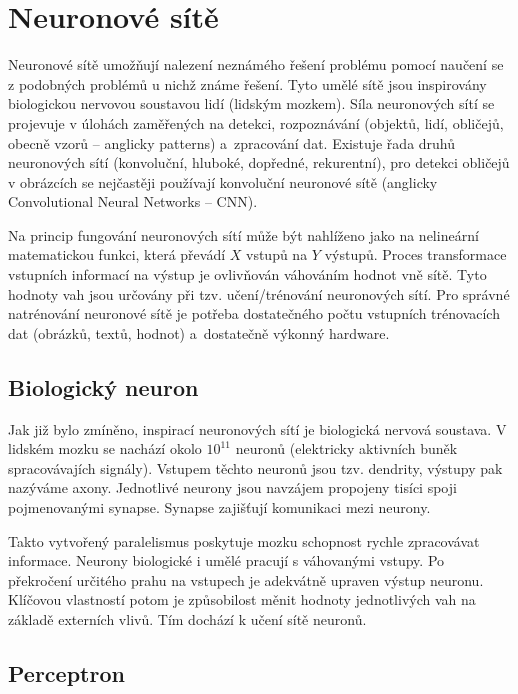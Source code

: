 \section{Neuronové sítě}
\label{sekce:NS}

Neuronové sítě \cite{deeplearningbook, ns1994} umožňují nalezení neznámého řešení problému pomocí naučení se z podobných problémů u nichž známe řešení. Tyto umělé sítě jsou inspirovány biologickou nervovou soustavou lidí (lidským mozkem). Síla neuronových sítí se projevuje v úlohách zaměřených na detekci, rozpoznávání (objektů, lidí, obličejů, obecně vzorů -- anglicky patterns) a~zpracování dat. Existuje řada druhů neuronových sítí (konvoluční, hluboké, dopředné, rekurentní), pro detekci obličejů v obrázcích se nejčastěji používají konvoluční neuronové sítě (anglicky Convolutional Neural Networks -- CNN). 

Na princip fungování neuronových sítí může být nahlíženo jako na nelineární matematickou funkci, která převádí $X$ vstupů na $Y$ výstupů. Proces transformace vstupních informací na výstup je ovlivňován váhováním hodnot vně sítě. Tyto hodnoty vah jsou určovány při tzv. učení/trénování neuronových sítí. Pro správné natrénování neuronové sítě je potřeba dostatečného počtu vstupních trénovacích dat (obrázků, textů, hodnot) a~dostatečně výkonný hardware. 

\subsection*{Biologický neuron}
Jak již bylo zmíněno, inspirací neuronových sítí je biologická nervová soustava. V lidském mozku se nachází okolo $10^{11}$ neuronů (elektricky aktivních buněk spracovávajích signály). Vstupem těchto neuronů jsou tzv. dendrity, výstupy pak nazýváme axony. Jednotlivé neurony jsou navzájem propojeny tisíci spoji pojmenovanými synapse. Synapse zajišťují komunikaci mezi neurony.

Takto vytvořený paralelismus poskytuje mozku schopnost rychle zpracovávat informace. Neurony biologické i umělé pracují s váhovanými vstupy. Po překročení určitého prahu na vstupech je adekvátně upraven výstup neuronu. Klíčovou vlastností potom je způsobilost měnit hodnoty jednotlivých vah na základě externích vlivů. Tím dochází k učení sítě neuronů.

\subsection*{Perceptron}

